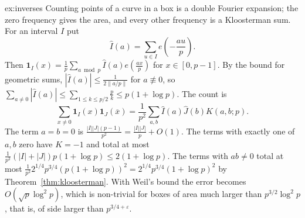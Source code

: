 \begin{solution}{ex:inverses}
\idea Counting points of a curve in a box is a double Fourier expansion; the zero frequency gives the area, and every other frequency is a Kloosterman sum.
\writeup For an interval $I$ put
\[
\hat I(a)=\sum_{u\in I}e\!\left(-\frac{au}p\right).
\]
Then $\mathbf 1_I(x)=\frac1p\sum_{a\bmod p}\hat I(a)e(\frac{ax}p)$ for $x\in[0,p-1]$. By the bound for geometric sums, $|\hat I(a)|\le\frac1{2\|a/p\|}$ for $a\not\equiv0$, so $\sum_{a\ne0}|\hat I(a)|\le\sum_{1\le k\le p/2}\frac pk\le p(1+\log p)$. The count is
\[
\sum_{x\ne0}\mathbf 1_I(x)\mathbf 1_J(\overline x)=\frac1{p^2}\sum_{a,b}\hat I(a)\hat J(b)K(a,b;p).
\]
The term $a=b=0$ is $\frac{|I||J|(p-1)}{p^2}=\frac{|I||J|}p+O(1)$. The terms with exactly one of $a,b$ zero have $K=-1$ and total at most $\frac1{p^2}(|I|+|J|)p(1+\log p)\le2(1+\log p)$. The terms with $ab\ne0$ total at most $\frac1{p^2}2^{1/4}p^{3/4}(p(1+\log p))^2=2^{1/4}p^{3/4}(1+\log p)^2$ by Theorem~\ref{thm:kloosterman}. With Weil's bound the error becomes $O(\sqrt p\log^2p)$, which is non-trivial for boxes of area much larger than $p^{3/2}\log^2p$, that is, of side larger than $p^{3/4+\varepsilon}$.
\end{solution}

